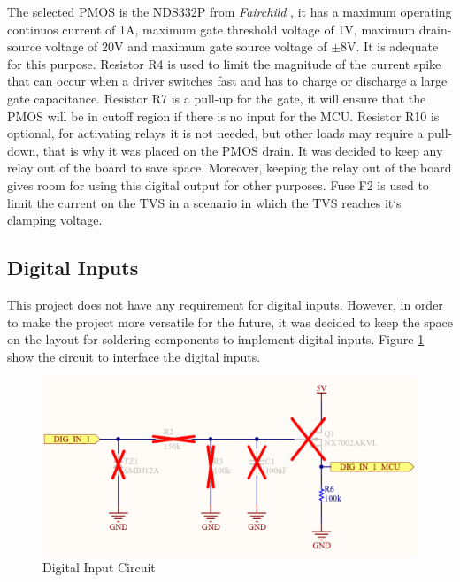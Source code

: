 			The selected PMOS is the NDS332P from \textit{Fairchild} \cite{nds332p-datasheet}, it has a maximum operating continuos current of 1A, maximum gate threshold voltage of 1V, maximum drain-source voltage of 20V and maximum gate source voltage of $\pm$8V. It is adequate for this purpose. Resistor R4 is used to limit the magnitude of the current spike that can occur when a driver switches fast and has to charge or discharge a large gate capacitance. Resistor R7 is a pull-up for the gate, it will ensure that the PMOS will be in cutoff region if there is no input for the MCU. Resistor R10 is optional, for activating relays it is not needed, but other loads may require a pull-down, that is why it was placed on the PMOS drain. It was decided to keep any relay out of the board to save space. Moreover, keeping the relay out of the board gives room for using this digital output for other purposes. Fuse F2 is used to limit the current on the TVS in a scenario in which the TVS reaches it`s clamping voltage.

	\subsection{Digital Inputs}\label{ssec:digital-inputs}

		This project does not have any requirement for digital inputs. However, in order to make the project more versatile for the future, it was decided to keep the space on the layout for soldering components to implement digital inputs. Figure \ref{fig:digital-input-circuit} show the circuit to interface the digital inputs.

			\begin{figure}[htbp]
				\centering
				\includegraphics[scale=1]{figuras/fig-digital-input-circuit.png}
				\caption{Digital Input Circuit \cite{digital-input-circuit}}
				\label{fig:digital-input-circuit}
			\end{figure}

